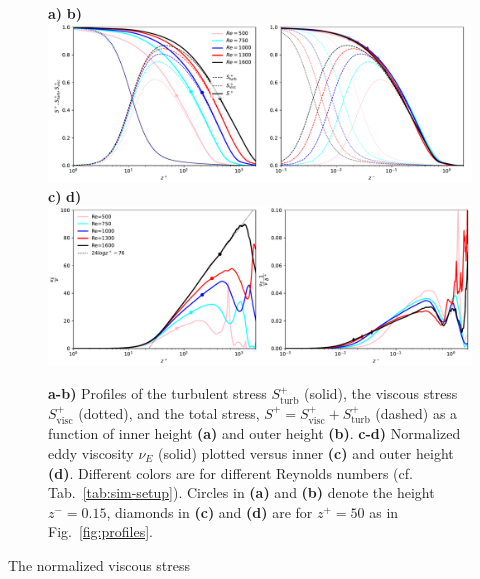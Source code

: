 \documentclass[a4paper,11pt]{amsart}
\begin{document}
\begin{figure}
  \begin{flushleft} 
    \textbf{a)}\hspace{0.47\textwidth} \textbf{b)}\\
    \includegraphics[width=\textwidth]{../plot/stresses.pdf}
    \textbf{c)}\hspace{0.47\textwidth} \textbf{d)}\\    
    \includegraphics[width=\textwidth]{../plot/eddy_viscosity.pdf}\\
  \end{flushleft} 
  \caption{
    \textbf{a-b)} Profiles of
    the turbulent stress $S_\mathrm{turb}^+$ (solid), 
    the viscous stress  $S_\mathrm{visc}^+$ (dotted), 
    and the total stress, $S^+=S_\mathrm{visc}^++S_\mathrm{turb}^+$ (dashed)
    as a function of inner height \textbf{(a)} and outer height \textbf{(b)}. 
    \textbf{c-d)} Normalized eddy viscosity $\nu_E$ (solid) plotted versus
    inner \textbf{(c)} and outer height \textbf{(d)}.
    Different colors are for different Reynolds numbers (cf. Tab.~\ref{tab:sim-setup}).
    Circles in \textbf{(a)} and \textbf{(b)} denote the height
    $z^-=0.15$, diamonds in \textbf{(c)} and \textbf{(d)} are for $z^+=50$
    as in Fig.~\ref{fig:profiles}.
    \label{fig:stresses}}  
\end{figure} 
The normalized viscous stress
%
\end{document}
